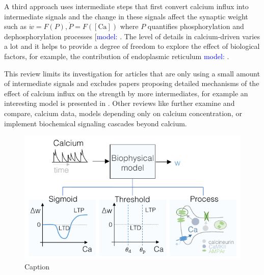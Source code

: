 A third approach uses intermediate steps that first convert calcium influx into intermediate signals and the change in these signals affect the synaptic weight such as $\dot{w} = F(P),  \dot{P} =F([\mathrm{Ca}])$ where  $P$ quantifies phosphorylation and dephosphorylation processes [\textcolor{blue}{model:} \citep{abarbanel_biophysical_2003, rubin_calcium_2005, badoual_biophysical_2006, hartley_understanding_2006, graupner_stdp_2007, gerkin_phenomenological_2010, bush_calcium_2012, houben_calcium-influx-dependent_2020, kornijcuk_simplified_2020, saudargiene_inhibitory_2015, ebner_unifying_2019}. The level of details in calcium-driven varies a lot and it helps to provide a degree of freedom to explore the effect of biological factors, for example, the contribution of endoplasmic reticulum  \textcolor{blue}{model:} \citep{ kubota_model_2008, urakubo_requirement_2008, mahajan_intracellular_2019}.


This review limits its investigation for articles that are only using a small amount of intermediate signals and excludes papers proposing  detailed mechanisms of the effect of calcium influx on the strength by more intermediates, for example an interesting model is presented in \cite{maki-marttunen_unified_2020, kotaleski_modelling_2010}. Other reviews like \cite{graupner_mechanisms_2010, jaeger_spike_2014} further examine and compare, calcium data, models depending only on calcium concentration, or implement biochemical signaling cascades beyond calcium. 



\begin{figure}[h!]
    \centering
    \includegraphics{latex/fig/Methods/ModelRecap_Ca.pdf}
    \caption{Caption}
    \label{fig:my_label}
\end{figure}

